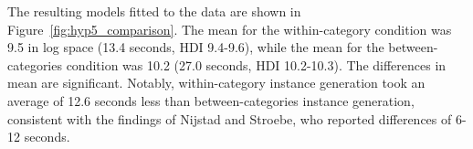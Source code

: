 The resulting models fitted to the data are shown in Figure~\ref{fig:hyp5_comparison}. The mean for the within-category condition was 9.5 in log space (13.4 seconds, HDI 9.4-9.6), while the mean for the between-categories condition was 10.2 (27.0 seconds, HDI 10.2-10.3). The differences in mean are significant. Notably, within-category instance generation took an average of 12.6 seconds less than between-categories instance generation, consistent with the findings of Nijstad and Stroebe, who reported differences of 6-12 seconds.







